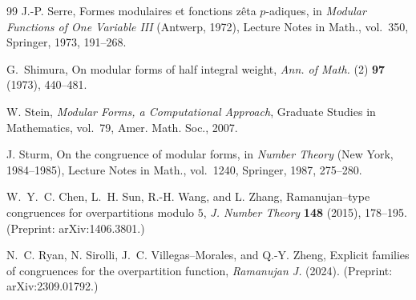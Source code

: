 \documentclass[11pt]{article}
\theoremstyle{definition}
\theoremstyle{remark}
\begin{document}
\begin{thebibliography}{99}
J.-P. Serre,
Formes modulaires et fonctions zêta $p$-adiques,
in \emph{Modular Functions of One Variable III} (Antwerp, 1972),
Lecture Notes in Math., vol.~350, Springer, 1973, 191--268.

G.~Shimura,
On modular forms of half integral weight,
\emph{Ann. of Math.} (2) \textbf{97} (1973), 440--481.

W. Stein,
\emph{Modular Forms, a Computational Approach},
Graduate Studies in Mathematics, vol.~79, Amer. Math. Soc., 2007.

J. Sturm,
On the congruence of modular forms,
in \emph{Number Theory} (New York, 1984--1985),
Lecture Notes in Math., vol.~1240, Springer, 1987, 275--280.

W.~Y.~C. Chen, L.~H. Sun, R.-H. Wang, and L. Zhang,
Ramanujan--type congruences for overpartitions modulo $5$,
\emph{J. Number Theory} \textbf{148} (2015), 178--195.
(Preprint: arXiv:1406.3801.)

N.~C. Ryan, N. Sirolli, J.~C. Villegas--Morales, and Q.-Y. Zheng,
Explicit families of congruences for the overpartition function,
\emph{Ramanujan J.} (2024).
(Preprint: arXiv:2309.01792.)


\end{thebibliography}
\end{document}
